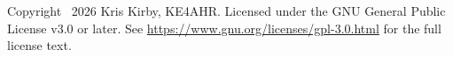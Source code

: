\documentclass[10pt]{article}
\begin{document}
\clearpage
\printbibliography[heading=bibintoc,title={References}]

\vfill
\begin{center}
\footnotesize
Copyright \textcopyright\ 2026 Kris Kirby, KE4AHR\@.
Licensed under the GNU General Public License v3.0 or later.
See \url{https://www.gnu.org/licenses/gpl-3.0.html} for the full license text.
\end{center}
\end{document}

